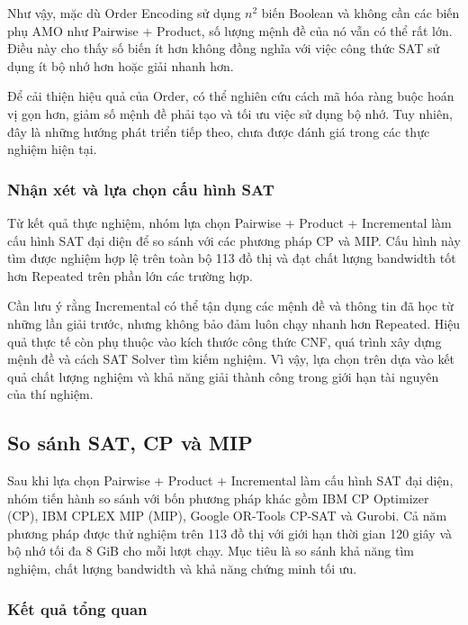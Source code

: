 \documentclass[a4paper,fleqn]{cas-sc}
\begin{document}
Như vậy, mặc dù Order Encoding sử dụng $n^2$ biến Boolean và không cần các biến phụ AMO như Pairwise + Product, số lượng mệnh đề của nó vẫn có thể rất lớn. Điều này cho thấy số biến ít hơn không đồng nghĩa với việc công thức SAT sử dụng ít bộ nhớ hơn hoặc giải nhanh hơn.

Để cải thiện hiệu quả của Order, có thể nghiên cứu cách mã hóa ràng buộc hoán vị gọn hơn, giảm số mệnh đề phải tạo và tối ưu việc sử dụng bộ nhớ. Tuy nhiên, đây là những hướng phát triển tiếp theo, chưa được đánh giá trong các thực nghiệm hiện tại.

\subsubsection{Nhận xét và lựa chọn cấu hình SAT}

Từ kết quả thực nghiệm, nhóm lựa chọn Pairwise + Product + Incremental làm cấu hình SAT đại diện để so sánh với các phương pháp CP và MIP. Cấu hình này tìm được nghiệm hợp lệ trên toàn bộ 113 đồ thị và đạt chất lượng bandwidth tốt hơn Repeated trên phần lớn các trường hợp.

Cần lưu ý rằng Incremental có thể tận dụng các mệnh đề và thông tin đã học từ những lần giải trước, nhưng không bảo đảm luôn chạy nhanh hơn Repeated. Hiệu quả thực tế còn phụ thuộc vào kích thước công thức CNF, quá trình xây dựng mệnh đề và cách SAT Solver tìm kiếm nghiệm. Vì vậy, lựa chọn trên dựa vào kết quả chất lượng nghiệm và khả năng giải thành công trong giới hạn tài nguyên của thí nghiệm.

\FloatBarrier


\subsection{So sánh SAT, CP và MIP}

Sau khi lựa chọn Pairwise + Product + Incremental làm cấu hình SAT đại diện, nhóm tiến hành so sánh với bốn phương pháp khác gồm IBM CP Optimizer (CP), IBM CPLEX MIP (MIP), Google OR-Tools CP-SAT và Gurobi. Cả năm phương pháp được thử nghiệm trên 113 đồ thị với giới hạn thời gian 120 giây và bộ nhớ tối đa 8 GiB cho mỗi lượt chạy. Mục tiêu là so sánh khả năng tìm nghiệm, chất lượng bandwidth và khả năng chứng minh tối ưu.

\subsubsection{Kết quả tổng quan}
\end{document}
